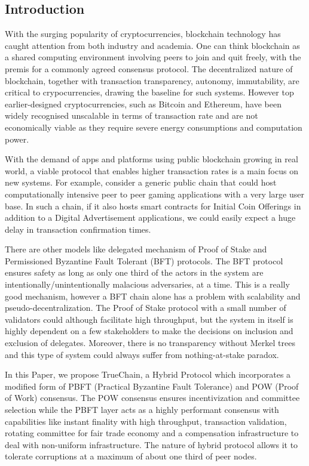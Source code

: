 \documentclass[9pt,oneside]{amsart}
\begin{document}
\setlength{\columnsep}{20pt}
\begin{multicols}{2}

\section{Introduction}

With the surging popularity of cryptocurrencies, blockchain technology has caught attention from both industry and academia.
One can think blockchain as a shared computing environment involving peers to join and quit freely, with the premis for a commonly
agreed consensus protocol. The decentralized nature of blockchain, together with transaction transparency, autonomy, immutability,
are critical to crypocurrencies, drawing the baseline for such systems. However top earlier-designed cryptocurrencies,
such as Bitcoin\cite{nakamoto2008bitcoin} and Ethereum\cite{buterinethereum}, have been widely recognised unscalable in terms
of transaction rate and are not economically viable as they require severe energy consumptions and computation power.

With the demand of apps and platforms using public blockchain growing in real world, a viable protocol that enables higher
transaction rates is a main focus on new systems. For example, consider a generic public chain that could host computationally intensive
peer to peer gaming applications with a very large user base. In such a chain, if it also hosts smart contracts for Initial Coin
Offerings in addition to a Digital Advertisement applications, we could easily expect a huge delay in transaction confirmation times.

There are other models like delegated mechanism of Proof of Stake and Permissioned Byzantine Fault Tolerant (BFT) protocols.
The BFT protocol ensures safety as long as only one third of the actors in the system are intentionally/unintentionally malacious adversaries,
at a time. This is a really good mechanism, however a BFT chain alone has a problem with scalability and pseudo-decentralization.
The Proof of Stake protocol with a small number of validators could although facilitate high throughput, but the system in itself is
highly dependent on a few stakeholders to make the decisions on inclusion and exclusion of delegates. Moreover, there is no transparency
without Merkel trees and this type of system could always suffer from nothing-at-stake paradox.

In this Paper, we propose TrueChain, a Hybrid Protocol\cite{pass2017hybrid} which incorporates a modified form of PBFT (Practical Byzantine
Fault Tolerance)\cite{castro1999practical} and POW (Proof of Work) consensus. The POW consensus ensures incentivization and committee selection while the PBFT layer acts as a highly performant consensus
with capabilities like instant finality with high throughput, transaction validation, rotating committee for fair trade economy
and a compensation infrastructure to deal with non-uniform infrastructure. The nature of hybrid protocol allows it to tolerate
corruptions at a maximum of about one third of peer nodes.


\end{multicols}
\end{document}
